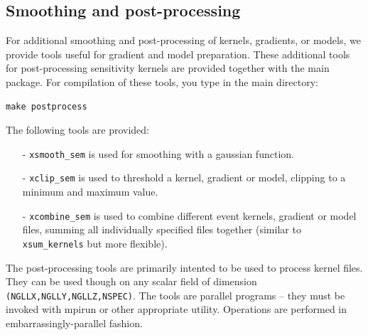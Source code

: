 \subsection{Smoothing and post-processing}
For additional smoothing and post-processing of kernels, gradients, or models, we provide tools useful for gradient and model preparation.
These additional tools for post-processing sensitivity kernels are provided together with the main package. For compilation of these tools, you type in the main directory:
\begin{verbatim}
make postprocess
\end{verbatim}

\noindent
The following tools are provided:
\begin{enumerate}
\item [-] \texttt{xsmooth\_sem} is used for smoothing with a gaussian function.
\item [-] \texttt{xclip\_sem} is used to threshold a kernel, gradient or model, clipping to a minimum and maximum value.
\item [-] \texttt{xcombine\_sem} is used to combine different event kernels, gradient or model files, summing all individually specified files together (similar to \texttt{xsum\_kernels} but more flexible).
\end{enumerate}
The post-processing tools are primarily intented to be used to process kernel files. They can be used though on
any scalar field of dimension \texttt{(NGLLX,NGLLY,NGLLZ,NSPEC)}.
The tools are parallel programs -- they must be invoked with mpirun or other
appropriate utility.  Operations are performed in embarrassingly-parallel fashion.



